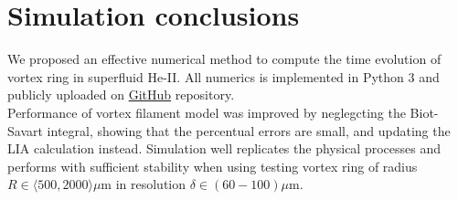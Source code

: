 \section{Simulation conclusions}

We proposed an effective numerical method to compute the time evolution of vortex ring in superfluid He-II. All numerics is implemented in Python 3 and publicly uploaded on \href{https://github.com/KuboBahyl/superfluid}{GitHub} repository.\\
Performance of vortex filament model was improved by neglegcting the Biot-Savart integral, showing that the percentual errors are small, and updating the LIA calculation instead. Simulation well replicates the physical processes and performs with sufficient stability when using testing vortex ring of radius $R \in \langle 500, 2000 \rangle \mu\text{m}$ in resolution $\delta \in (60 - 100) \mu\text{m}$.


\newpage
